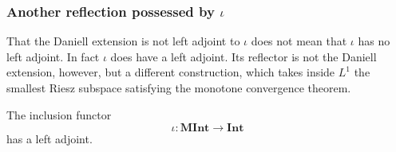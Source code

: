 \subsubsection{Another reflection possessed by $\iota$}

That the Daniell extension is not left adjoint to $\iota$ does not mean that
$\iota$ has no left adjoint.
In fact $\iota$ does have a left adjoint.
Its reflector is not the Daniell extension, however, but a different
construction, which takes inside $L^1$ the smallest Riesz subspace satisfying
the monotone convergence theorem.

\begin{theorem}\label{thm:mint-inclusion-has-left-adjoint}
  The inclusion functor
  \[
    \iota:\mathbf{MInt}\to\mathbf{Int}
  \]
  has a left adjoint.
\end{theorem}
